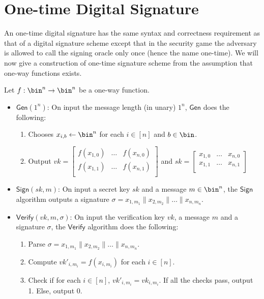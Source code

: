 \documentclass[12pt]{tufte-book}
\newcommand{\Gen}{\mathsf{Gen}}
\newcommand{\Sign}{\mathsf{Sign}}
\newcommand{\Verify}{\mathsf{Verify}}
\begin{document}
\section{One-time Digital Signature}
\label{lampart}
An one-time digital signature has the same syntax and correctness requirement as that of a digital signature scheme except that in the security game the adversary is allowed to call the signing oracle only once (hence the name one-time). We will now give a construction of one-time signature scheme from the assumption that one-way functions exists.

Let $f: \bin^n \rightarrow \bin^n$ be a one-way function.
\begin{itemize}
\item $\Gen(1^n)$: On input the message length (in unary) $1^n$, $\Gen$ does the following:
\begin{enumerate}
    \item Chooses $x_{i,b} \gets \bin^n$ for each $i \in [n]$ and $b \in \bin$.
    \item Output $vk = \left[ \begin{array}{ccc}
f(x_{1,0}) & \ldots & f(x_{n,0}) \\
f(x_{1,1}) & \ldots & f(x_{n,1}) \\
\end{array} \right]$ and $sk = \left[ \begin{array}{ccc}
x_{1,0} & \ldots & x_{n,0} \\
x_{1,1} & \ldots & x_{n,1} \\
\end{array} \right]$
\end{enumerate}
\item $\Sign(sk, m)$: On input a secret key $sk$ and a message $m \in \bin^n$, the $\Sign$ algorithm outputs a signature $\sigma = x_{1,m_1}\|x_{2,m_2}\| \ldots \| x_{n,m_n}$.
\item $\Verify(vk, m, \sigma)$: On input the verification key $vk$, a message $m$ and a signature $\sigma$, the $\Verify$ algorithm does the following:
\begin{enumerate}
    \item Parse $\sigma = x_{1,m_1}\|x_{2,m_2}\| \ldots \| x_{n,m_n}$.
    \item Compute $vk'_{i,m_i} = f(x_{i,m_i})$ for each $i \in [n]$.
    \item Check if for each $i \in [n]$, $vk'_{i,m_i} = vk_{i,m_i}$. If all the checks pass, output 1. Else, output 0.
\end{enumerate}
\end{itemize}
\end{document}
